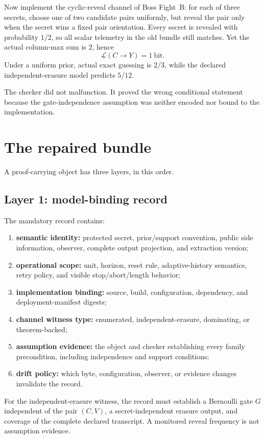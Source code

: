 \documentclass[11pt]{article}
\newcommand{\MaxL}{\mathcal{L}}
\begin{document}
Now implement the cyclic-reveal channel of Boss Fight~B: for each of three secrets, choose one of two candidate pairs uniformly, but reveal the pair only when the secret wins a fixed pair orientation. Every secret is revealed with probability \(1/2\), so all scalar telemetry in the old bundle still matches. Yet the actual column-max sum is \(2\), hence
\[
\MaxL(C\to Y)=1\ \text{bit}.
\]
Under a uniform prior, actual exact guessing is \(2/3\), while the declared independent-erasure model predicts \(5/12\).

The checker did not malfunction. It proved the wrong conditional statement because the gate-independence assumption was neither encoded nor bound to the implementation.

\section{The repaired bundle}\label{sec:bundle}
A proof-carrying object has three layers, in this order.

\subsection{Layer 1: model-binding record}
The mandatory record contains:
\begin{enumerate}[leftmargin=*]
\item \textbf{semantic identity:} protected secret, prior/support convention, public side information, observer, complete output projection, and extraction version;
\item \textbf{operational scope:} unit, horizon, reset rule, adaptive-history semantics, retry policy, and visible stop/abort/length behavior;
\item \textbf{implementation binding:} source, build, configuration, dependency, and deployment-manifest digests;
\item \textbf{channel witness type:} enumerated, independent-erasure, dominating, or theorem-backed;
\item \textbf{assumption evidence:} the object and checker establishing every family precondition, including independence and support conditions;
\item \textbf{drift policy:} which byte, configuration, observer, or evidence changes invalidate the record.
\end{enumerate}

For the independent-erasure witness, the record must establish a Bernoulli gate \(G\) independent of the pair \((C,V)\), a secret-independent erasure output, and coverage of the complete declared transcript. A monitored reveal frequency is not assumption evidence.
\end{document}
